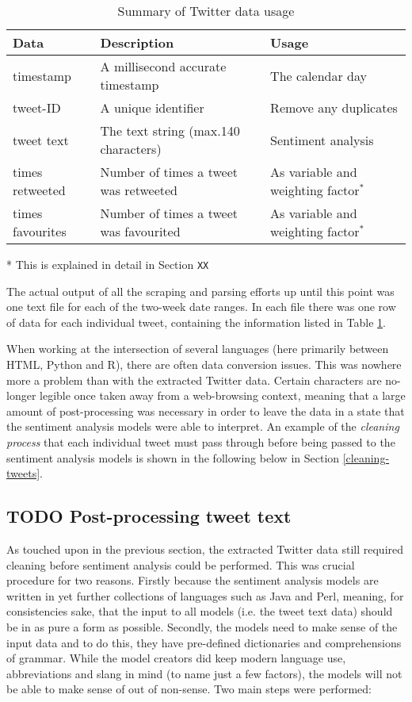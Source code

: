 \documentclass{article}
\begin{document}
\begin{table}[htb]
\centering
\begin{tabular}{l|l|l}
Data & Description & Usage\\
\hline
timestamp & A millisecond accurate timestamp & The calendar day\\
tweet-ID & A unique identifier & Remove any duplicates\\
tweet text & The text string (max.140 characters) & Sentiment analysis\\
times retweeted & Number of times a tweet was retweeted & As variable and weighting factor$^{\text{*}}$\\
times favourites & Number of times a tweet was favourited & As variable and weighting factor$^{\text{*}}$\\
\end{tabular}\caption{\label{table:twitter-data-usage}Summary of Twitter data usage}

\end{table}

\mbox{*} This is explained in detail in Section \texttt{XX} 

The actual output of all the scraping and parsing efforts up until this point was one text file for each of the two-week date ranges. In each file there was one row of data for each individual tweet, containing the information listed in Table \ref{table:twitter-data-usage}.

When working at the intersection of several languages (here primarily between HTML, Python and R), there are often data conversion issues. This was nowhere more a problem than with the extracted Twitter data. Certain characters are no-longer legible once taken away from a web-browsing context, meaning that a large amount of post-processing was necessary in order to leave the data in a state that the sentiment analysis models were able to interpret. An example of the \emph{cleaning process} that each individual tweet must pass through before being passed to the sentiment analysis models is shown in the following below in Section \ref{cleaning-tweets}.


\subsection{{\bfseries\sffamily TODO} Post-processing tweet text \label{cleaning-tweets}}
\label{sec-3-5}

As touched upon in the previous section, the extracted Twitter data still required cleaning before sentiment analysis could be performed. This was crucial procedure for two reasons. Firstly because the sentiment analysis models are written in yet further collections of languages such as Java and Perl, meaning, for consistencies sake, that the input to all models (i.e. the tweet text data) should be in as pure a form as possible. Secondly, the models need to make sense of the input data and to do this, they have pre-defined dictionaries and comprehensions of grammar. While the model creators did keep modern language use, abbreviations and slang in mind (to name just a few factors), the models will not be able to make sense of out of non-sense. \newline Two main steps were performed:
\end{document}

